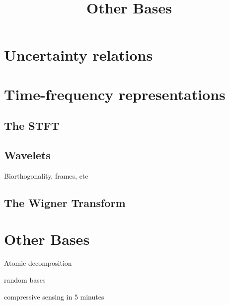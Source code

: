 
\title{Other Bases}

\section{Uncertainty relations}

\section{Time-frequency representations}

\subsection{The STFT}

\subsection{Wavelets}
Biorthogonality, frames, etc

\subsection{The Wigner Transform}


\section{Other Bases}
Atomic decomposition

random bases

compressive sensing in 5 minutes







